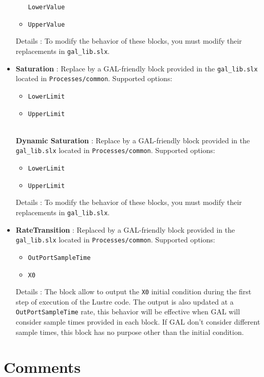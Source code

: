 \documentclass[a4paper,12pt]{article}
\begin{document}
\begin{itemize}
\begin{itemize}
	\texttt{LowerValue}
	\item
	\texttt{UpperValue}
	\end{itemize}
Details : To modify the behavior of these blocks, you must modify their replacements in \texttt{gal\_lib.slx}. 
~\\
\item
\textbf{Saturation} : Replace by a GAL-friendly block provided in the \texttt{gal\_lib.slx} located in \texttt{Processes/common}. \newline
	Supported options: 
	\begin{itemize}
	\item
	\texttt{LowerLimit}
	\item
	\texttt{UpperLimit}
	\end{itemize}
	~\\
\textbf{Dynamic Saturation} : Replace by a GAL-friendly block provided in the \texttt{gal\_lib.slx} located in \texttt{Processes/common}. \newline
Supported options: 
	\begin{itemize}
	\item
	\texttt{LowerLimit}
	\item
	\texttt{UpperLimit}
	\end{itemize}
Details : To modify the behavior of these blocks, you must modify their replacements in \texttt{gal\_lib.slx}. 
~\\
\item
\textbf{RateTransition} : Replaced by a GAL-friendly block provided in the \texttt{gal\_lib.slx} located in \texttt{Processes/common}. \newline
	Supported options:
	\begin{itemize}
	\item
	\texttt{OutPortSampleTime}
	\item
	\texttt{X0}
	\end{itemize}
Details : The block allow to output the \texttt{X0} initial condition during the first step of execution of the Lustre code. The output is also updated at a \texttt{OutPortSampleTime} rate, this behavior will be effective when GAL will consider sample times provided in each block.
If GAL don't consider different sample times, this block has no purpose other than the initial condition.
\end{itemize}

\section{Comments}
\end{document}
